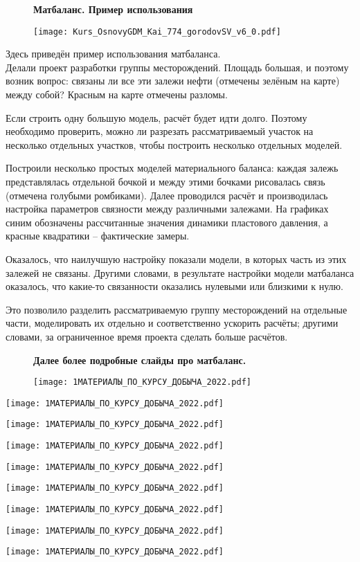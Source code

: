 \begin{figure}[H]
\textbf{Матбаланс. Пример использования}

\texttt{[image: Kurs\_OsnovyGDM\_Kai\_774\_gorodovSV\_v6\_0.pdf]}
\end{figure}

Здесь приведён пример использования матбаланса.
\\

Делали проект разработки группы месторождений.
Площадь большая, и поэтому возник вопрос: связаны ли все эти залежи нефти (отмечены зелёным на карте) между собой?
Красным на карте отмечены разломы.

Если строить одну большую модель, расчёт будет идти долго. Поэтому необходимо проверить, можно ли разрезать рассматриваемый участок на несколько отдельных участков, чтобы построить несколько отдельных моделей.

Построили несколько простых моделей материального баланса: каждая залежь представлялась отдельной бочкой и между этими бочками рисовалась связь (отмечена голубыми ромбиками). Далее проводился расчёт и производилась настройка параметров связности между различными залежами.
На графиках синим обозначены рассчитанные значения динамики пластового давления, а красные квадратики -- фактические замеры.

Оказалось, что наилучшую настройку показали модели, в которых часть из этих залежей не связаны.
Другими словами, в результате настройки модели матбаланса оказалось, что какие-то связанности оказались нулевыми или близкими к нулю.

Это позволило разделить рассматриваемую группу месторождений на отдельные части, моделировать их отдельно и соответственно ускорить расчёты; другими словами, за ограниченное время проекта сделать больше расчётов.
\\

\begin{figure}[H]
\textbf{Далее более подробные слайды про матбаланс.}

\texttt{[image: 1МАТЕРИАЛЫ\_ПО\_КУРСУ\_ДОБЫЧА\_2022.pdf]}
\end{figure}

\texttt{[image: 1МАТЕРИАЛЫ\_ПО\_КУРСУ\_ДОБЫЧА\_2022.pdf]}

\texttt{[image: 1МАТЕРИАЛЫ\_ПО\_КУРСУ\_ДОБЫЧА\_2022.pdf]}

\texttt{[image: 1МАТЕРИАЛЫ\_ПО\_КУРСУ\_ДОБЫЧА\_2022.pdf]}

\texttt{[image: 1МАТЕРИАЛЫ\_ПО\_КУРСУ\_ДОБЫЧА\_2022.pdf]}

\texttt{[image: 1МАТЕРИАЛЫ\_ПО\_КУРСУ\_ДОБЫЧА\_2022.pdf]}

\texttt{[image: 1МАТЕРИАЛЫ\_ПО\_КУРСУ\_ДОБЫЧА\_2022.pdf]}

\texttt{[image: 1МАТЕРИАЛЫ\_ПО\_КУРСУ\_ДОБЫЧА\_2022.pdf]}

\texttt{[image: 1МАТЕРИАЛЫ\_ПО\_КУРСУ\_ДОБЫЧА\_2022.pdf]}

